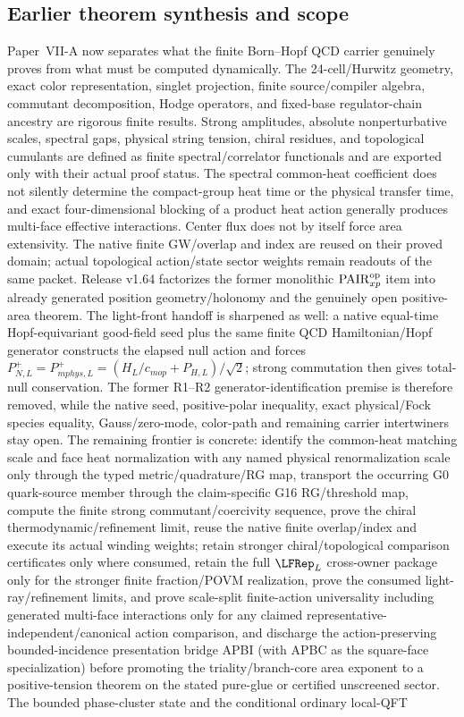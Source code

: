 \documentclass[12pt,a4paper]{article}
\begin{document}
\subsection{Earlier theorem synthesis and scope}
Paper~VII-A now separates what the finite Born--Hopf QCD carrier genuinely proves from what must be computed dynamically.  The 24-cell/Hurwitz geometry, exact color representation, singlet projection, finite source/compiler algebra, commutant decomposition, Hodge operators, and fixed-base regulator-chain ancestry are rigorous finite results.  Strong amplitudes, absolute nonperturbative scales, spectral gaps, physical string tension, chiral residues, and topological cumulants are defined as finite spectral/correlator functionals and are exported only with their actual proof status.  The spectral common-heat coefficient does not silently determine the compact-group heat time or the physical transfer time, and exact four-dimensional blocking of a product heat action generally produces multi-face effective interactions.  Center flux does not by itself force area extensivity.  The native finite GW/overlap and index are reused on their proved domain; actual topological action/state sector weights remain readouts of the same packet.  Release v1.64 factorizes the former monolithic \(\mathrm{PAIR}_{xp}^{\rm op}\) item into already generated position geometry/holonomy and the genuinely open positive-area theorem.  The light-front handoff is sharpened as well: a native equal-time Hopf-equivariant good-field seed plus the same finite QCD Hamiltonian/Hopf generator constructs the elapsed null action and forces \(P_{N,L}^+=P_{
m phys,L}^+=(H_L/c_{
m op}+P_{H,L})/\sqrt2\); strong commutation then gives total-null conservation.  The former R1--R2 generator-identification premise is therefore removed, while the native seed, positive-polar inequality, exact physical/Fock species equality, Gauss/zero-mode, color-path and remaining carrier intertwiners stay open.  The remaining frontier is concrete: identify the common-heat matching scale and face heat normalization with any named physical renormalization scale only through the typed metric/quadrature/RG map, transport the occurring G0 quark-source member through the claim-specific G16 RG/threshold map, compute the finite strong commutant/coercivity sequence, prove the chiral thermodynamic/refinement limit, reuse the native finite overlap/index and execute its actual winding weights; retain stronger chiral/topological comparison certificates only where consumed, retain the full \(\LFRep_L\) cross-owner package only for the stronger finite fraction/POVM realization, prove the consumed light-ray/refinement limits, and prove scale-split finite-action universality including generated multi-face interactions only for any claimed representative-independent/canonical action comparison, and discharge the action-preserving bounded-incidence presentation bridge APBI (with APBC as the square-face specialization) before promoting the triality/branch-core area exponent to a positive-tension theorem on the stated pure-glue or certified unscreened sector.  The bounded phase-cluster state and the conditional ordinary local-QFT
\end{document}
